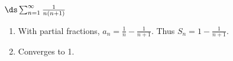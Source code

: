 {$\ds \sum_{n=1}^\infty \frac{1}{n(n+1)}$
}
{\begin{enumerate}
\item		With partial fractions, $a_n = \frac1n-\frac1{n+1}$. Thus $S_n = 1-\frac1{n+1}$.
\item		Converges to 1.
\end{enumerate}
}